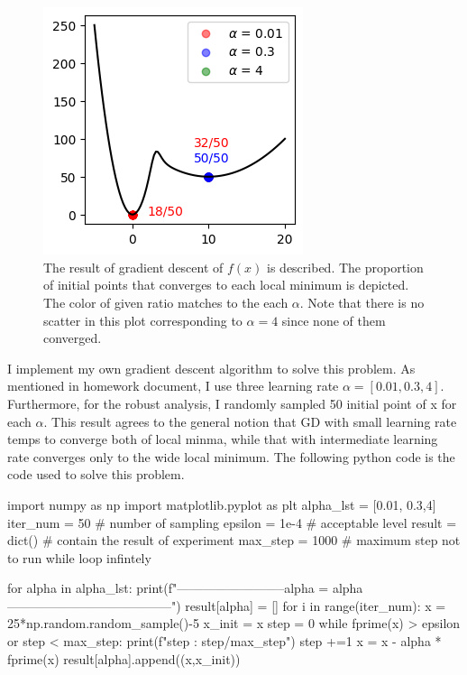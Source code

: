 \documentclass[10pt]{article}
\begin{document}
\section{}
\begin{figure}[!h]
    \begin{center}
        \includegraphics{Fig1.png}
        \caption{The result of gradient descent of $f(x)$ is described. The proportion of initial points that converges to each local minimum is depicted. The color of given ratio matches to the each $\alpha$. Note that there is no scatter in this plot corresponding to $\alpha = 4$ since none of them converged. }
    \end{center}
\end{figure}

I implement my own gradient descent algorithm to solve this problem. As mentioned in homework document, I use three learning rate $\alpha = [0.01,0.3,4]$. Furthermore,
for the robust analysis, I randomly sampled 50 initial point of x for each $\alpha$. This result agrees to the general notion that GD with small learning rate temps to converge both of local minma, while that with intermediate learning rate converges only to the wide local minimum. 
The following python code is the code used to solve this problem.

\begin{python}
import numpy as np
import matplotlib.pyplot as plt
alpha_lst = [0.01, 0.3,4]
iter_num = 50 # number of sampling
epsilon = 1e-4 # acceptable level
result = dict() # contain the result of experiment
max_step = 1000 # maximum step not to run while loop infintely

for alpha in alpha_lst:
    print(f"--------------------------alpha = {alpha}---------------------------------------")
    result[alpha] = []
    for i in range(iter_num):
        x = 25*np.random.random_sample()-5
        x_init = x
        step = 0
        while fprime(x) > epsilon or step < max_step:
            print(f"step : {step}/{max_step}")
            step +=1
            x = x - alpha * fprime(x)
        result[alpha].append((x,x_init))
\end{python}
\end{document}
